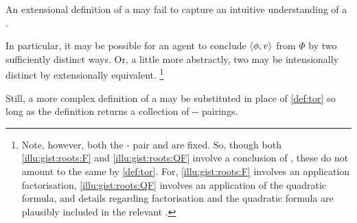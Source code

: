 \begin{note}
  An extensional definition of a  may fail to capture an intuitive understanding of a .

  In particular, it may be possible for an agent to conclude \(\langle\phi, v\rangle\) from \(\Phi\) by two sufficiently distinct ways.
  Or, a little more abstractly, two  may be intensionally distinct by extensionally equivalent.%
  \footnote{
    Note, however, both the - pair and \pool{} are fixed.
    So, though both \autoref{illu:gist:roots:F} and \autoref{illu:gist:roots:QF} involve a conclusion of , these  do not amount to the same \torN{} by \autoref{def:tor}.
    For, \autoref{illu:gist:roots:F} involves an application factorisation, \autoref{illu:gist:roots:QF} involves an application of the quadratic formula, and details regarding factorisation and the quadratic formula are plausibly included in the relevant .
  }

  Still, a more complex definition of a  may be substituted in place of \autoref{def:tor} so long as the definition returns a collection of -- pairings.
\end{note}


